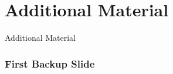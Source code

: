 \section*{Additional Material}

\begin{frame}[noframenumbering]
    \centering
    \Huge{Additional Material}
\end{frame}

\begin{frame}[noframenumbering, label=backup1]
\frametitle{First Backup Slide}
\centering
\end{frame}
